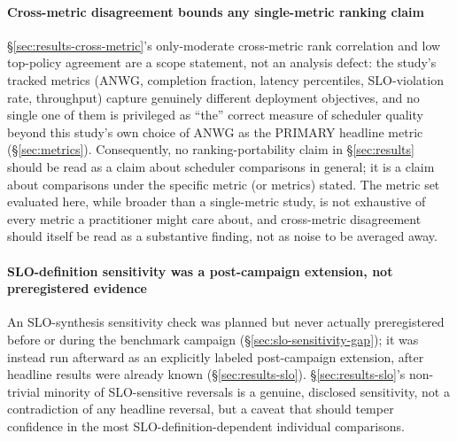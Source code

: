 \paragraph{Cross-metric disagreement bounds any single-metric ranking
claim} \S\ref{sec:results-cross-metric}'s only-moderate cross-metric rank
correlation and low top-policy agreement are a scope statement, not an
analysis defect: the study's tracked metrics (ANWG, completion fraction,
latency percentiles, SLO-violation rate, throughput) capture genuinely
different deployment objectives, and no single one of them is privileged
as ``the'' correct measure of scheduler quality beyond this study's own
choice of ANWG as the PRIMARY headline metric (\S\ref{sec:metrics}).
Consequently, no ranking-portability claim in \S\ref{sec:results} should
be read as a claim about scheduler comparisons in general; it is a claim
about comparisons under the specific metric (or metrics) stated. The
metric set evaluated here, while broader than a single-metric study, is
not exhaustive of every metric a practitioner might care about, and
cross-metric disagreement should itself be read as a substantive finding,
not as noise to be averaged away.

\paragraph{SLO-definition sensitivity was a post-campaign extension, not
preregistered evidence} An SLO-synthesis sensitivity check was planned but
never actually preregistered before or during the benchmark campaign
(\S\ref{sec:slo-sensitivity-gap}); it was instead run afterward as an
explicitly labeled post-campaign extension, after headline results were
already known (\S\ref{sec:results-slo}). \S\ref{sec:results-slo}'s
non-trivial minority of SLO-sensitive reversals is a genuine, disclosed
sensitivity, not a contradiction of any headline reversal, but a caveat
that should temper confidence in the most SLO-definition-dependent
individual comparisons.


